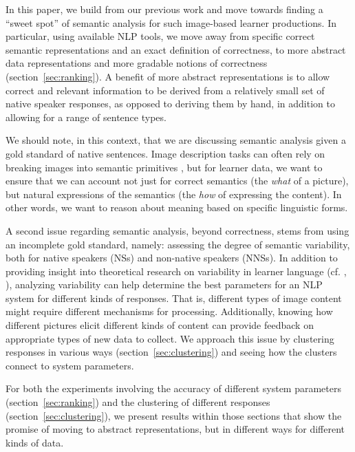 \documentclass[11pt,letterpaper]{article}
\begin{document}
In this paper, we build from our previous work \citep{king:dickinson:13, king:dickinson:14} and move towards finding a ``sweet spot'' of
semantic analysis \citep[cf.][]{bailey:meurers:08} for such
image-based learner productions.
In particular, using available NLP tools,
we move away from specific correct semantic representations and an
exact definition of correctness, to more abstract data representations
and more gradable notions of correctness (section~\ref{sec:ranking}).
A benefit of more abstract representations is to allow correct
and relevant information to be derived from a relatively small set of
native speaker responses, as opposed to deriving them by hand, in
addition to allowing for a range of sentence types.

We should note, in this context, that we are discussing semantic
analysis given a gold standard of native sentences.  Image description
tasks can often rely on breaking images into semantic primitives
\citep[see, e.g.,][and references therein]{ortiz:wolff:lapata:15}, but
for learner data, we want to ensure that we can account not just for
correct semantics (the \emph{what} of a picture), but natural
expressions of the semantics (the \emph{how} of expressing the
content).  In other words, we want to reason about meaning based on
specific linguistic forms.

A second issue regarding semantic analysis, beyond correctness, stems
from using an incomplete gold standard, namely: assessing the degree
of semantic variability, both for native speakers (NSs) and non-native
speakers (NNSs).
In addition to providing insight into
theoretical research on variability 
in learner language (cf. \citet{ellis1987variability}, \citet{kanno1998consistency}), analyzing variability can help determine
the best parameters for an NLP system for different kinds of
responses.  That is, different types of image content might require
different mechanisms for processing.  Additionally, knowing how
different pictures elicit different kinds of content can provide
feedback on appropriate types of new data to collect.
We approach this issue by clustering responses in various ways
(section~\ref{sec:clustering}) and seeing how the clusters connect to
system parameters.

For both the experiments involving the accuracy of different system
parameters (section~\ref{sec:ranking}) and the clustering of different
responses (section~\ref{sec:clustering}), we present results within
those sections that show the promise of moving to abstract representations, but in
different ways for different kinds of data.
\end{document}
